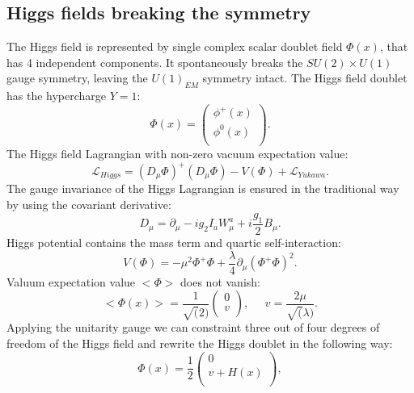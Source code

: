 \subsection{Higgs fields breaking the symmetry}
The Higgs field is represented by single complex scalar doublet field $\Phi(x)$, that has 4 independent components. It spontaneously breaks the  $SU(2)\times U(1)$ gauge symmetry, leaving the $U(1)_{EM}$ symmetry intact. The Higgs field doublet has the hypercharge $Y=1$:
  \begin{equation}
\Phi(x) = \begin{pmatrix}
\phi^{+}(x)  \\
\phi^{0}(x)  \\
\end{pmatrix}.
\end{equation}
The Higgs field Lagrangian with non-zero vacuum expectation value: 
 \begin{equation}
\mathcal{L}_{Higgs} = (D_{\mu}\Phi)^+(D_{\mu}\Phi)-V(\Phi)+\mathcal{L}_{Yukawa}.
\end{equation}
The gauge invariance of the Higgs Lagrangian is ensured in the traditional way by using the covariant derivative:
 \begin{equation}
D_{\mu} = \partial_{\mu} - ig_2I_aW^a_{\mu}+i\frac{g_1}{2}B_{\mu}.
\end{equation}
Higgs potential contains the mass term and quartic self-interaction:
 \begin{equation}
V(\Phi) = -\mu^2 \Phi^+\Phi + \frac{\lambda}{4}\partial_{\mu}(\Phi^+\Phi)^2.
\end{equation}
Valuum expectation value $<\Phi>$ does not vanish:
  \begin{equation}
<\Phi(x)> = \frac{1}{\sqrt(2)}\begin{pmatrix}
0  \\
v \\
\end{pmatrix},\;\;\;\;\; 
v = \frac{2\mu}{\sqrt(\lambda)}.
\end{equation}
Applying the unitarity gauge \cite{weinberg2} we can constraint three out of four degrees of freedom of the Higgs field and rewrite the Higgs doublet in the following way:
  \begin{equation}
 \Phi(x) = \frac{1}{2}\begin{pmatrix}
 	0 \\
 	v+H(x)  \\
 \end{pmatrix},
  \end{equation}
